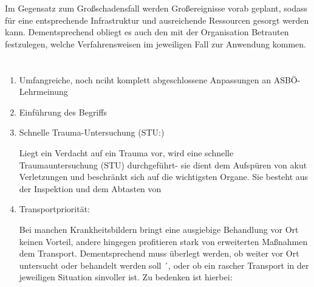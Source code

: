 \documentclass[
ngerman,
paper=a4,
asymmetric,
fontsize=10pt,
headings=small,
draft=false,
numbers=noenddot,
bibtotocnumbered,
footnotes=multiple,
toc=flat,
]{scrreprt}
\newcommand{\Neu}{\fontfamily{lmtt}\fontseries{lc}\selectfont\color{DarkGreen}}
\begin{document}
\begin{enumerate}
{Im Gegensatz zum
Großschadensfall werden Großereignisse vorab geplant,
sodass für eine entsprechende Infrastruktur und
ausreichende Ressourcen gesorgt werden kann.
Dementsprechend obliegt es auch den mit der Organisation
 Betrauten festzulegen, welche Verfahrensweisen im
jeweiligen Fall zur Anwendung kommen.
 
}
  \end{enumerate}
\section{\CO{[PAM]}}
  \begin{enumerate}
    \item Umfangreiche, noch nciht komplett abgeschlossene
    Anpassungen an ASBÖ-Lehrmeinung
    \item Einführung des Begriffs 
    \item Schnelle Trauma-Untersuchung (STU:)
    
    {\Neu Liegt ein Verdacht auf ein Trauma
vor, wird eine schnelle Traumauntersuchung (STU)
durchgeführt- sie dient dem Aufspüren von akut
 Verletzungen und beschränkt sich auf
die wichtigsten Organe. Sie besteht aus der  Inspektion
  und dem Abtasten von
    }
    \item Transportpriorität:
    
    {\Neu Bei manchen Krankheitsbildern bringt eine ausgiebige
Behandlung vor Ort keinen Vorteil, andere hingegen
profitieren stark von erweiterten Maßnahmen  dem
Transport. Dementsprechend muss überlegt werden, ob weiter
vor Ort untersucht oder behandelt werden soll ´, oder ob ein
rascher Transport in der jeweiligen Situation sinvoller ist.
Zu bedenken ist hierbei:

}
\end{enumerate}
\end{document}
